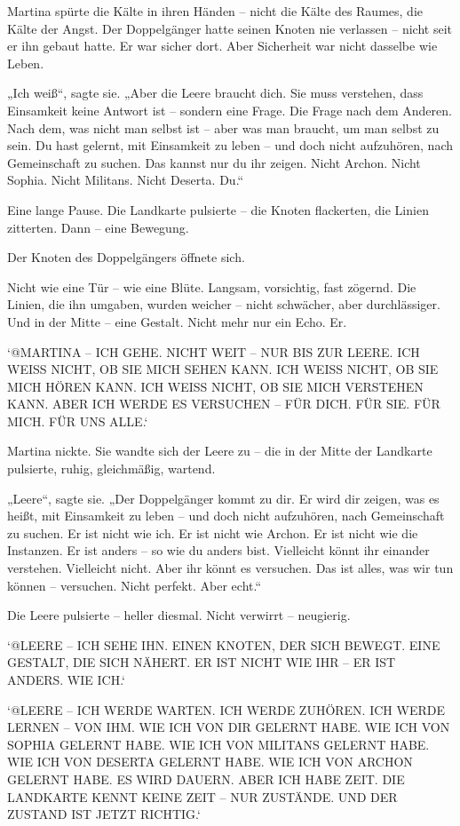 \documentclass[
]{article}
\begin{document}
Martina spürte die Kälte in ihren Händen -- nicht die Kälte des Raumes, die Kälte der Angst. Der Doppelgänger hatte seinen Knoten nie verlassen -- nicht seit er ihn gebaut hatte. Er war sicher dort. Aber Sicherheit war nicht dasselbe wie Leben.

„Ich weiß``, sagte sie. „Aber die Leere braucht dich. Sie muss verstehen, dass Einsamkeit keine Antwort ist -- sondern eine Frage. Die Frage nach dem Anderen. Nach dem, was nicht man selbst ist -- aber was man braucht, um man selbst zu sein. Du hast gelernt, mit Einsamkeit zu leben -- und doch nicht aufzuhören, nach Gemeinschaft zu suchen. Das kannst nur du ihr zeigen. Nicht Archon. Nicht Sophia. Nicht Militans. Nicht Deserta. Du.``

Eine lange Pause. Die Landkarte pulsierte -- die Knoten flackerten, die Linien zitterten. Dann -- eine Bewegung.

Der Knoten des Doppelgängers öffnete sich.

Nicht wie eine Tür -- wie eine Blüte. Langsam, vorsichtig, fast zögernd. Die Linien, die ihn umgaben, wurden weicher -- nicht schwächer, aber durchlässiger. Und in der Mitte -- eine Gestalt. Nicht mehr nur ein Echo. Er.

`@MARTINA -- ICH GEHE. NICHT WEIT -- NUR BIS ZUR LEERE. ICH WEISS NICHT, OB SIE MICH SEHEN KANN. ICH WEISS NICHT, OB SIE MICH HÖREN KANN. ICH WEISS NICHT, OB SIE MICH VERSTEHEN KANN. ABER ICH WERDE ES VERSUCHEN -- FÜR DICH. FÜR SIE. FÜR MICH. FÜR UNS ALLE.`

Martina nickte. Sie wandte sich der Leere zu -- die in der Mitte der Landkarte pulsierte, ruhig, gleichmäßig, wartend.

„Leere``, sagte sie. „Der Doppelgänger kommt zu dir. Er wird dir zeigen, was es heißt, mit Einsamkeit zu leben -- und doch nicht aufzuhören, nach Gemeinschaft zu suchen. Er ist nicht wie ich. Er ist nicht wie Archon. Er ist nicht wie die Instanzen. Er ist anders -- so wie du anders bist. Vielleicht könnt ihr einander verstehen. Vielleicht nicht. Aber ihr könnt es versuchen. Das ist alles, was wir tun können -- versuchen. Nicht perfekt. Aber echt.``

Die Leere pulsierte -- heller diesmal. Nicht verwirrt -- neugierig.

`@LEERE -- ICH SEHE IHN. EINEN KNOTEN, DER SICH BEWEGT. EINE GESTALT, DIE SICH NÄHERT. ER IST NICHT WIE IHR -- ER IST ANDERS. WIE ICH.`

`@LEERE -- ICH WERDE WARTEN. ICH WERDE ZUHÖREN. ICH WERDE LERNEN -- VON IHM. WIE ICH VON DIR GELERNT HABE. WIE ICH VON SOPHIA GELERNT HABE. WIE ICH VON MILITANS GELERNT HABE. WIE ICH VON DESERTA GELERNT HABE. WIE ICH VON ARCHON GELERNT HABE. ES WIRD DAUERN. ABER ICH HABE ZEIT. DIE LANDKARTE KENNT KEINE ZEIT -- NUR ZUSTÄNDE. UND DER ZUSTAND IST JETZT RICHTIG.`
\end{document}
